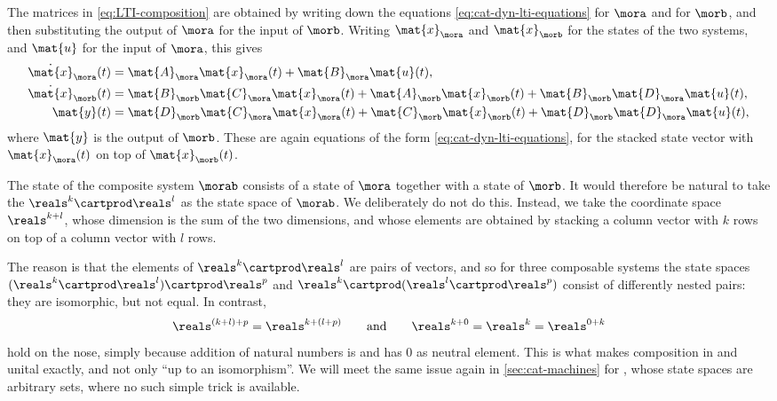 \begin{remark}
    The matrices in \cref{eq:LTI-composition} are obtained by writing down the equations \cref{eq:cat-dyn-lti-equations} for $\mora$ and for $\morb$, and then substituting the output of $\mora$ for the input of $\morb$.
    Writing $\mat{x}_\mora$ and $\mat{x}_\morb$ for the states of the two systems, and $\mat{u}$ for the input of $\mora$, this gives
    \begin{equation}
        \begin{aligned}
            \dot{\mat{x}}_\mora(t) & = \mat{A}_\mora\mat{x}_\mora(t) + \mat{B}_\mora\mat{u}(t), \\
            \dot{\mat{x}}_\morb(t) & = \mat{B}_\morb\mat{C}_\mora\mat{x}_\mora(t) + \mat{A}_\morb\mat{x}_\morb(t) + \mat{B}_\morb\mat{D}_\mora\mat{u}(t), \\
            \mat{y}(t)             & = \mat{D}_\morb\mat{C}_\mora\mat{x}_\mora(t) + \mat{C}_\morb\mat{x}_\morb(t) + \mat{D}_\morb\mat{D}_\mora\mat{u}(t),
        \end{aligned}
    \end{equation}
    where $\mat{y}$ is the output of $\morb$.
    These are again equations of the form \cref{eq:cat-dyn-lti-equations}, for the stacked state vector with $\mat{x}_\mora(t)$ on top of $\mat{x}_\morb(t)$.
\end{remark}

\begin{remark}
    \label{rem:LTI-state-space-trick}
    The state of the composite system $\morab$ consists of a state of $\mora$ together with a state of $\morb$.
    It would therefore be natural to take the  $\reals^k \cartprod \reals^l$ as the state space of $\morab$.
    We deliberately do not do this.
    Instead, we take the coordinate space $\reals^{k+l}$, whose dimension is the sum of the two dimensions, and whose elements are obtained by stacking a column vector with $k$ rows on top of a column vector with $l$ rows.

    The reason is that the elements of $\reals^k \cartprod \reals^l$ are pairs of vectors, and so for three composable systems the state spaces $(\reals^k \cartprod \reals^l) \cartprod \reals^p$ and $\reals^k \cartprod (\reals^l \cartprod \reals^p)$ consist of differently nested pairs: they are isomorphic, but not equal.
    In contrast,
    \begin{equation}
        \reals^{(k+l)+p} = \reals^{k+(l+p)}
        \qquad \text{and} \qquad
        \reals^{k+0} = \reals^k = \reals^{0+k}
    \end{equation}
    hold on the nose, simply because addition of natural numbers is  and has $0$ as neutral element.
    This is what makes composition in \LTI {} and unital exactly, and not only ``up to an isomorphism''.
    We will meet the same issue again in \cref{sec:cat-machines} for , whose state spaces are arbitrary sets, where no such simple trick is available.
\end{remark}

